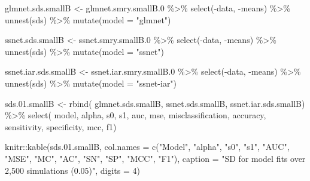 \documentclass[
]{article}
\newenvironment{Shaded}{\begin{snugshade}}{\end{snugshade}}
\newcommand{\AttributeTok}[1]{\textcolor[rgb]{0.77,0.63,0.00}{#1}}
\newcommand{\DecValTok}[1]{\textcolor[rgb]{0.00,0.00,0.81}{#1}}
\newcommand{\FloatTok}[1]{\textcolor[rgb]{0.00,0.00,0.81}{#1}}
\newcommand{\FunctionTok}[1]{\textcolor[rgb]{0.00,0.00,0.00}{#1}}
\newcommand{\NormalTok}[1]{#1}
\newcommand{\OtherTok}[1]{\textcolor[rgb]{0.56,0.35,0.01}{#1}}
\newcommand{\SpecialCharTok}[1]{\textcolor[rgb]{0.00,0.00,0.00}{#1}}
\newcommand{\StringTok}[1]{\textcolor[rgb]{0.31,0.60,0.02}{#1}}
\begin{document}
\begin{Shaded}
\begin{Highlighting}[]
\NormalTok{glmnet.sds.smallB }\OtherTok{\textless{}{-}}\NormalTok{ glmnet.smry.smallB}\FloatTok{.0} \SpecialCharTok{\%\textgreater{}\%}
  \FunctionTok{select}\NormalTok{(}\SpecialCharTok{{-}}\NormalTok{data, }\SpecialCharTok{{-}}\NormalTok{means) }\SpecialCharTok{\%\textgreater{}\%}
  \FunctionTok{unnest}\NormalTok{(sds) }\SpecialCharTok{\%\textgreater{}\%} 
  \FunctionTok{mutate}\NormalTok{(}\AttributeTok{model =} \StringTok{"glmnet"}\NormalTok{)}

\NormalTok{ssnet.sds.smallB }\OtherTok{\textless{}{-}}\NormalTok{ ssnet.smry.smallB}\FloatTok{.0} \SpecialCharTok{\%\textgreater{}\%}
  \FunctionTok{select}\NormalTok{(}\SpecialCharTok{{-}}\NormalTok{data, }\SpecialCharTok{{-}}\NormalTok{means) }\SpecialCharTok{\%\textgreater{}\%}
  \FunctionTok{unnest}\NormalTok{(sds) }\SpecialCharTok{\%\textgreater{}\%}
  \FunctionTok{mutate}\NormalTok{(}\AttributeTok{model =} \StringTok{"ssnet"}\NormalTok{)}

\NormalTok{ssnet.iar.sds.smallB }\OtherTok{\textless{}{-}}\NormalTok{ ssnet.iar.smry.smallB}\FloatTok{.0} \SpecialCharTok{\%\textgreater{}\%}
  \FunctionTok{select}\NormalTok{(}\SpecialCharTok{{-}}\NormalTok{data, }\SpecialCharTok{{-}}\NormalTok{means) }\SpecialCharTok{\%\textgreater{}\%}
  \FunctionTok{unnest}\NormalTok{(sds) }\SpecialCharTok{\%\textgreater{}\%}
  \FunctionTok{mutate}\NormalTok{(}\AttributeTok{model =} \StringTok{"ssnet{-}iar"}\NormalTok{)}

\NormalTok{sds.}\FloatTok{01.}\NormalTok{smallB }\OtherTok{\textless{}{-}} \FunctionTok{rbind}\NormalTok{(}
\NormalTok{  glmnet.sds.smallB,}
\NormalTok{  ssnet.sds.smallB,}
\NormalTok{  ssnet.iar.sds.smallB) }\SpecialCharTok{\%\textgreater{}\%}
  \FunctionTok{select}\NormalTok{(}
\NormalTok{    model, alpha, s0, s1, auc, mse, misclassification,}
\NormalTok{    accuracy, sensitivity, specificity, mcc, f1)}

\NormalTok{knitr}\SpecialCharTok{::}\FunctionTok{kable}\NormalTok{(sds.}\FloatTok{01.}\NormalTok{smallB,}
             \AttributeTok{col.names =} \FunctionTok{c}\NormalTok{(}\StringTok{"Model"}\NormalTok{, }\StringTok{"alpha"}\NormalTok{, }\StringTok{"s0"}\NormalTok{, }\StringTok{"s1"}\NormalTok{,}
                           \StringTok{"AUC"}\NormalTok{, }\StringTok{"MSE"}\NormalTok{, }\StringTok{"MC"}\NormalTok{, }\StringTok{"AC"}\NormalTok{, }\StringTok{"SN"}\NormalTok{, }\StringTok{"SP"}\NormalTok{, }\StringTok{"MCC"}\NormalTok{, }\StringTok{"F1"}\NormalTok{),}
             \AttributeTok{caption =} \StringTok{"SD for model fits over 2,500 simulations (0.05)"}\NormalTok{,}
             \AttributeTok{digits =} \DecValTok{4}\NormalTok{)}
\end{Highlighting}
\end{Shaded}
\end{document}
